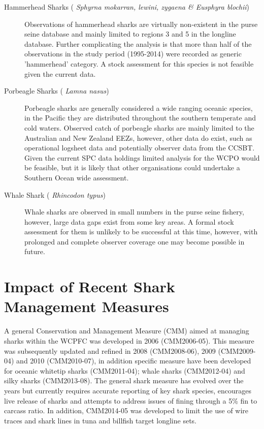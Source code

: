 \documentclass[12pt]{SCreport}
\begin{document}
\begin{description}
\item[ Hammerhead Sharks (\emph{ Sphyrna mokarran, lewini, zygaena \& Eusphyra blochii}) ]  Observations of hammerhead sharks are virtually non-existent in the purse seine database and mainly limited to regions 3 and 5 in the longline database. Further complicating the analysis is that more than half of the observations in the study period (1995-2014) were recorded as generic 'hammerhead' category. A stock assessment for this species is not feasible given the current data. 

\item[ Porbeagle Sharks (\emph{ Lamna nasus}) ] Porbeagle sharks are generally considered a wide ranging oceanic species, in the Pacific they are distributed throughout the southern temperate and cold waters. Observed catch of porbeagle sharks are mainly limited to the Australian and New Zealand EEZs, however, other data do exist, such as operational logsheet data and potentially observer data from the CCSBT. Given the current SPC data holdings limited analysis for the WCPO would be feasible, but it is likely that other organisations could undertake a Southern Ocean wide assessment.

\item[ Whale Shark (\emph{ Rhincodon typus}) ] Whale sharks are observed in small numbers in the purse seine fishery, however, large data gaps exist from some key areas. A formal stock assessment for them is unlikely to be successful at this time, however, with prolonged and complete observer coverage one may become possible in future. 


\end{description}

\section{Impact of Recent Shark Management Measures}
A general Conservation and Management Measure (CMM) aimed at managing sharks within the WCPFC was developed in 2006 (CMM2006-05). This measure was subsequently updated and refined in 2008 (CMM2008-06), 2009 (CMM2009-04) and 2010 (CMM2010-07), in addition specific measure have been developed for oceanic whitetip sharks (CMM2011-04); whale sharks (CMM2012-04) and silky sharks (CMM2013-08). The general shark measure has evolved over the years but currently requires accurate reporting of key shark species, encourages live release of sharks and attempts to address issues of fining through a 5\% fin to carcass ratio. In addition, CMM2014-05 was developed to limit the use of wire traces and shark lines in tuna and billfish target longline sets.
\end{document}

